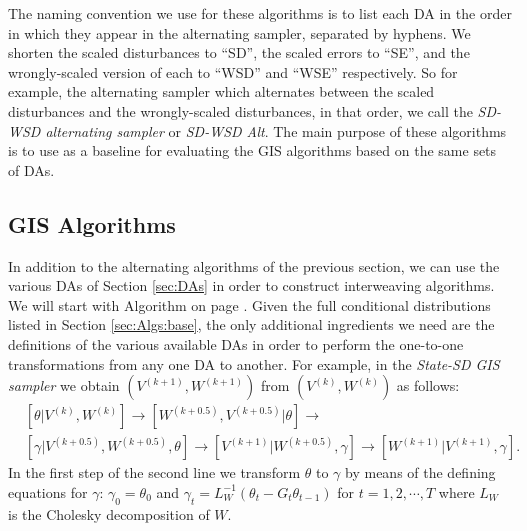 \documentclass[12pt]{article}
\begin{document}
The naming convention we use for these algorithms is to list each DA in the order in which they appear in the alternating sampler, separated by hyphens. We shorten the scaled disturbances to ``SD'', the scaled errors to ``SE'', and the wrongly-scaled version of each to ``WSD'' and ``WSE'' respectively. So for example, the alternating sampler which alternates between the scaled disturbances and the wrongly-scaled disturbances, in that order, we call the {\it SD-WSD alternating sampler} or {\it SD-WSD Alt}. The main purpose of these algorithms is to use as a baseline for evaluating the GIS algorithms based on the same sets of DAs.

\subsection{GIS Algorithms}\label{sec:Algs:GIS}
In addition to the alternating algorithms of the previous section, we can use the various DAs of Section \ref{sec:DAs} in order to construct interweaving algorithms. We will start with Algorithm  on page \pageref{alg:eGIS}. Given the full conditional distributions listed in Section \ref{sec:Algs:base}, the only additional ingredients we need are the definitions of the various available DAs in order to perform the one-to-one transformations from any one DA to another. For example, in the {\it State-SD GIS sampler} we obtain $(V^{(k+1)},W^{(k+1)})$ from $(V^{(k)},W^{(k)})$ as follows:
\begin{align*}
&[\theta|V^{(k)},W^{(k)}] \to [W^{(k+0.5)},V^{(k+0.5)}|\theta] \to\\
&[\gamma|V^{(k+0.5)},W^{(k+0.5)},\theta] \to [V^{(k+1)}|W^{(k+0.5)},\gamma] \to [W^{(k+1)}|V^{(k+1)},\gamma].
\end{align*}
In the first step of the second line we transform $\theta$ to $\gamma$ by means of the defining equations for $\gamma$: $\gamma_0=\theta_0$ and $\gamma_t = L_W^{-1}(\theta_t - G_t\theta_{t-1})$ for $t=1,2,\cdots,T$ where $L_W$ is the Cholesky decomposition of $W$.
\end{document}
